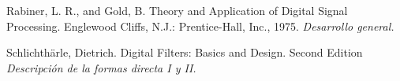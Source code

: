 \documentclass[informe.tex]{subfiles}
\begin{document}
Rabiner, L. R., and Gold, B. Theory and Application of Digital Signal Processing. Englewood Cliffs,
N.J.: Prentice-Hall, Inc., 1975.\newline 
\tab[1cm]\textit{ Desarrollo general.}\newline

Schlichthärle, Dietrich. Digital Filters: Basics and Design. Second Edition\newline
\tab[1cm]\textit{Descripción de la formas directa I y II.}\newline
\end{document}
